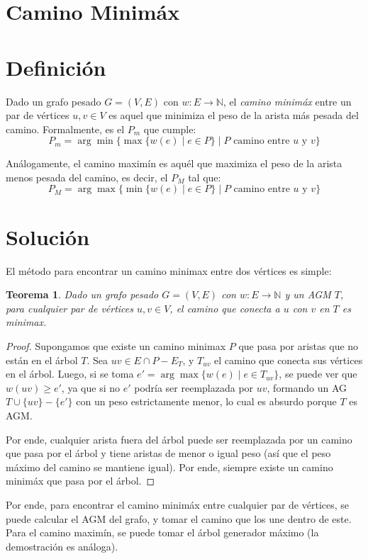 \documentclass[a4paper]{report}
\newcommand{\N}{\mathbb{N}}
\newtheorem*{theorem*}{Teorema}
\begin{document}
\section{Camino Minimáx}

\section{Definición}

Dado un grafo pesado $G = (V, E)$ con $w: E \longrightarrow \N$, el \textit{camino minimáx} entre un par de vértices $u, v \in V$ es aquel que minimiza el peso de la arista más pesada del camino. Formalmente, es el $P_m$ que cumple:
$$P_m = \arg\min{\{\max{\{w(e) \mid e \in P\}} \mid P \text{ camino entre $u$ y $v$}\}}$$

Análogamente, el camino maximín es aquél que maximiza el peso de la arista menos pesada del camino, es decir, el $P_M$ tal que:
$$P_M = \arg\max{\{\min{\{w(e) \mid e \in P\}} \mid P \text{ camino entre $u$ y $v$}\}}$$


\section{Solución}

El método para encontrar un camino minimax entre dos vértices es simple:
\begin{theorem*}
    Dado un grafo pesado $G = (V, E)$ con $w: E \longrightarrow \N$ y un AGM $T$, para cualquier par de vértices $u,v \in V$, el camino que conecta a $u$ con $v$ en $T$ es minimax.
\end{theorem*}
\begin{proof}
    Supongamos que existe un camino minimax $P$ que pasa por aristas que no están en el árbol $T$. Sea $uv \in E \cap P - E_T$, y $T_{uv}$ el camino que conecta sus vértices en el árbol. Luego, si se toma $e' = \arg\max{\{w(e) \mid e \in T_{uv}\}}$, se puede ver que $w(uv) \geq e'$, ya que si no $e'$ podría ser reemplazada por $uv$, formando un AG $T \cup \{uv\} - \{e'\}$ con un peso estrictamente menor, lo cual es absurdo porque $T$ es AGM.

    Por ende, cualquier arista fuera del árbol puede ser reemplazada por un camino que pasa por el árbol y tiene aristas de menor o igual peso (así que el peso máximo del camino se mantiene igual). Por ende, siempre existe un camino minimáx que pasa por el árbol.
\end{proof}

Por ende, para encontrar el camino minimáx entre cualquier par de vértices, se puede calcular el AGM del grafo, y tomar el camino que los une dentro de este. Para el camino maximín, se puede tomar el árbol generador máximo (la demostración es análoga).

\label{reducciones}
\end{document}
